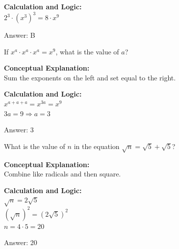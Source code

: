 \documentclass[11pt,paper=a4,answers]{exam}
\begin{document}
\begin{questions}
\begin{solution}
\vspace{20pt}

\textbf{Calculation and Logic:} \\
$2^3 \cdot (x^3)^3 = 8 \cdot x^9$

\vspace{25pt}

Answer: \colorbox{yellow!100}{B}
\end{solution}

\vspace{40pt}

\question
If $x^a \cdot x^a \cdot x^a = x^9$, what is the value of $a$?

\begin{solution}
\textbf{Conceptual Explanation:} \\
Sum the exponents on the left and set equal to the right.

\vspace{20pt}

\textbf{Calculation and Logic:} \\
$x^{a+a+a} = x^{3a} = x^9$ \\
$3a = 9 \Rightarrow a = 3$

\vspace{25pt}

Answer: \colorbox{yellow!100}{3}
\end{solution}

\vspace{40pt}

\question
What is the value of $n$ in the equation $\sqrt{n} = \sqrt{5} + \sqrt{5}$?

\begin{solution}
\textbf{Conceptual Explanation:} \\
Combine like radicals and then square.

\vspace{20pt}

\textbf{Calculation and Logic:} \\
$\sqrt{n} = 2\sqrt{5}$ \\
$(\sqrt{n})^2 = (2\sqrt{5})^2$ \\
$n = 4 \cdot 5 = 20$

\vspace{25pt}

Answer: \colorbox{yellow!100}{20}
\end{solution}


\end{questions}
\end{document}
